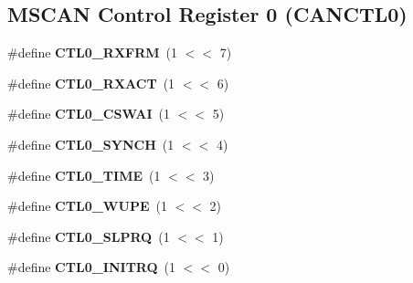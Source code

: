 \subsection*{M\+S\+C\+AN Control Register 0 (C\+A\+N\+C\+T\+L0)}
\begin{DoxyCompactItemize}
\item 
\mbox{\label{group__RTEMSBSPsPowerPCGen5200MSCAN_ga0c1e0802466479a9a7ccdd03d163254b}} 
\#define {\bfseries C\+T\+L0\+\_\+\+R\+X\+F\+RM}~(1 $<$$<$ 7)
\item 
\mbox{\label{group__RTEMSBSPsPowerPCGen5200MSCAN_gabb6317cdc4b4f3f7787bf61b186b7b9c}} 
\#define {\bfseries C\+T\+L0\+\_\+\+R\+X\+A\+CT}~(1 $<$$<$ 6)
\item 
\mbox{\label{group__RTEMSBSPsPowerPCGen5200MSCAN_gaa23364b44dd1256dd6367d12f6daafe1}} 
\#define {\bfseries C\+T\+L0\+\_\+\+C\+S\+W\+AI}~(1 $<$$<$ 5)
\item 
\mbox{\label{group__RTEMSBSPsPowerPCGen5200MSCAN_gac9bd4ccec8cf165737eb872bf5d3ede1}} 
\#define {\bfseries C\+T\+L0\+\_\+\+S\+Y\+N\+CH}~(1 $<$$<$ 4)
\item 
\mbox{\label{group__RTEMSBSPsPowerPCGen5200MSCAN_ga9fe85852b3691c3156564391f47699d9}} 
\#define {\bfseries C\+T\+L0\+\_\+\+T\+I\+ME}~(1 $<$$<$ 3)
\item 
\mbox{\label{group__RTEMSBSPsPowerPCGen5200MSCAN_ga5cf545f4efb65256f32db2ae5cd7885c}} 
\#define {\bfseries C\+T\+L0\+\_\+\+W\+U\+PE}~(1 $<$$<$ 2)
\item 
\mbox{\label{group__RTEMSBSPsPowerPCGen5200MSCAN_ga8563e365cf7a07618b2c202d5919d889}} 
\#define {\bfseries C\+T\+L0\+\_\+\+S\+L\+P\+RQ}~(1 $<$$<$ 1)
\item 
\mbox{\label{group__RTEMSBSPsPowerPCGen5200MSCAN_ga0c1bbcc814b45200af3b5634f2e67ed6}} 
\#define {\bfseries C\+T\+L0\+\_\+\+I\+N\+I\+T\+RQ}~(1 $<$$<$ 0)
\end{DoxyCompactItemize}
